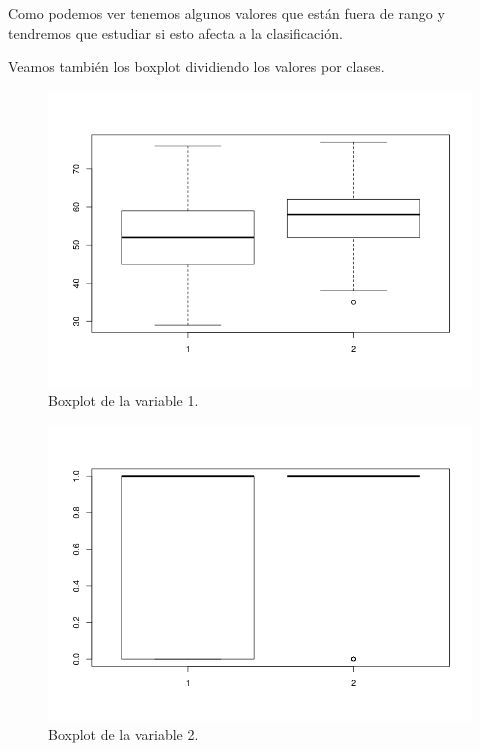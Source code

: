 \documentclass[12pt,a4paper]{article}
\begin{document}
Como podemos ver  tenemos algunos valores que están fuera de rango y tendremos que estudiar si esto afecta a la clasificación.

Veamos también los boxplot dividiendo los valores por clases.

\begin{figure}[H]
	\centering
	\includegraphics[scale=0.6]{./Imagenes/EDA/Clasificacion/boxplot_variable1.png}
	\caption{Boxplot de la variable 1.}
\end{figure}

\begin{figure}[H]
	\centering
	\includegraphics[scale=0.6]{./Imagenes/EDA/Clasificacion/boxplot_variable2.png}
	\caption{Boxplot de la variable 2.}
\end{figure}
\end{document}
